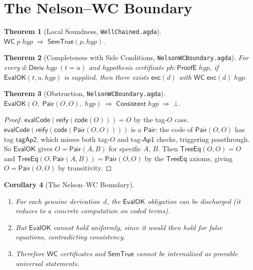 \documentclass[11pt]{article}
\newtheorem{theorem}{Theorem}
\newtheorem{corollary}[theorem]{Corollary}
\newcommand{\Deriv}{\mathsf{Deriv}}
\newcommand{\WC}{\mathsf{WC}}
\newcommand{\SemTrue}{\mathsf{SemTrue}}
\newcommand{\EvalOK}{\mathsf{EvalOK}}
\newcommand{\ProofE}{\mathsf{ProofE}}
\newcommand{\evalCode}{\mathsf{evalCode}}
\newcommand{\reify}{\mathsf{reify}}
\newcommand{\code}{\mathsf{code}}
\newcommand{\Consistent}{\mathsf{Consistent}}
\newcommand{\Pair}{\mathsf{Pair}}
\newcommand{\TreeEq}{\mathsf{TreeEq}}
\newcommand{\enc}{\mathsf{enc}}
\begin{document}
\section{The Nelson--WC Boundary}

\begin{theorem}[Local Soundness, \texttt{WellChained.agda}]
$\WC\;p\;\mathit{hyp} \;\Rightarrow\; \SemTrue(p, \mathit{hyp})$.
\end{theorem}

\begin{theorem}[Completeness with Side Conditions, \texttt{NelsonWCBoundary.agda}]
For every $d : \Deriv\;\mathit{hyp}\;(t = u)$ and hypothesis certificate
$\mathit{ph} : \ProofE\;\mathit{hyp}$, if $\EvalOK(t, u, \mathit{hyp})$
is supplied, then there exists $\enc(d)$ with $\WC\;\enc(d)\;\mathit{hyp}$.
\end{theorem}

\begin{theorem}[Obstruction, \texttt{NelsonWCBoundary.agda}]
\label{thm:obstruct}
$\EvalOK(O,\;\Pair(O,O),\;\mathit{hyp}) \;\Rightarrow\;
 \Consistent\;\mathit{hyp} \;\Rightarrow\; \bot$.
\end{theorem}

\begin{proof}
$\evalCode(\reify(\code(O))) = O$ by the tag-$O$ case.
$\evalCode(\reify(\code(\Pair(O,O))))$ is a $\Pair$: the code of $\Pair(O,O)$
has tag $\mathsf{tagAp2}$, which misses both tag-$O$ and tag-$\mathsf{Ap1}$ checks,
triggering passthrough.
So $\EvalOK$ gives $O = \Pair(A,B)$ for specific $A$, $B$.
Then $\TreeEq(O,O) = O$ and $\TreeEq(O, \Pair(A,B)) = \Pair(O,O)$
by the $\TreeEq$ axioms, giving $O = \Pair(O,O)$ by transitivity.
\end{proof}

\begin{corollary}[The Nelson--WC Boundary]
\label{cor:boundary}
\mbox{}
\begin{enumerate}
\item For each genuine derivation~$d$, the $\EvalOK$ obligation
  can be discharged (it reduces to a concrete computation on coded terms).
\item But $\EvalOK$ cannot hold uniformly, since it would then
  hold for false equations, contradicting consistency.
\item Therefore $\WC$ certificates and $\SemTrue$ cannot be
  internalized as provable universal statements.
\end{enumerate}
\end{corollary}
\end{document}
